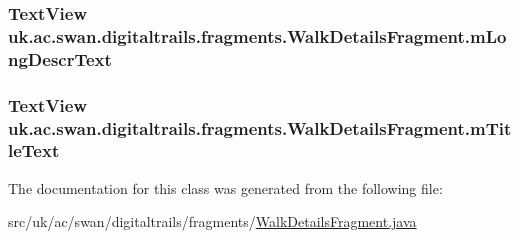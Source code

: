 \hypertarget{classuk_1_1ac_1_1swan_1_1digitaltrails_1_1fragments_1_1_walk_details_fragment_ad3a7b2a803acadbc7fdaee19e0d72c81}{
\subsubsection[{m\+Long\+Descr\+Text}]{\setlength{\rightskip}{0pt plus 5cm}Text\+View uk.\+ac.\+swan.\+digitaltrails.\+fragments.\+Walk\+Details\+Fragment.\+m\+Long\+Descr\+Text\hspace{0.3cm}{\ttfamily [protected]}}}\label{classuk_1_1ac_1_1swan_1_1digitaltrails_1_1fragments_1_1_walk_details_fragment_ad3a7b2a803acadbc7fdaee19e0d72c81}
\hypertarget{classuk_1_1ac_1_1swan_1_1digitaltrails_1_1fragments_1_1_walk_details_fragment_a9413fe91d82c12dd82f7d09040e6363e}{
\subsubsection[{m\+Title\+Text}]{\setlength{\rightskip}{0pt plus 5cm}Text\+View uk.\+ac.\+swan.\+digitaltrails.\+fragments.\+Walk\+Details\+Fragment.\+m\+Title\+Text\hspace{0.3cm}{\ttfamily [protected]}}}\label{classuk_1_1ac_1_1swan_1_1digitaltrails_1_1fragments_1_1_walk_details_fragment_a9413fe91d82c12dd82f7d09040e6363e}


The documentation for this class was generated from the following file\+:\begin{DoxyCompactItemize}
\item 
src/uk/ac/swan/digitaltrails/fragments/\hyperlink{_walk_details_fragment_8java}{Walk\+Details\+Fragment.\+java}\end{DoxyCompactItemize}
